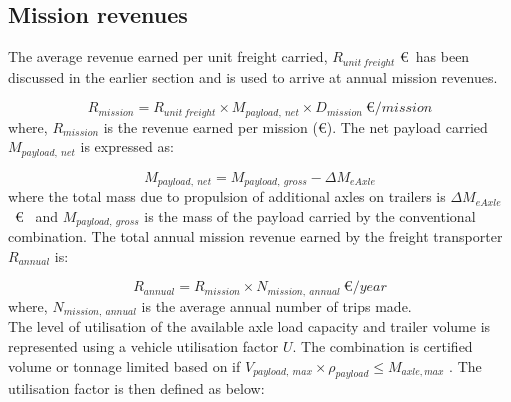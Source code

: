 \documentclass[ExampleMasters.tex]{subfiles}
\begin{document}
		\subsection{Mission revenues}

		The average revenue earned per unit freight carried, $R_{unit\ freight}$  \euro \ has been discussed in the earlier section and is used to arrive at annual mission revenues.

		\begin{equation}
			R_{mission} = R_{unit\ freight} \times M_{payload,\ net} \times D_{mission} \  \euro / mission
		\end{equation}
		where, $R_{mission}$  is the revenue earned per mission (\euro). The net payload carried $M_{payload,\ net}$ is expressed as:

		\begin{equation}
			M_{payload,\ net} = M_{payload,\ gross} - \Delta M_{eAxle}
		\end{equation}
		where the total mass due to propulsion of additional axles on trailers is $\Delta M_{eAxle}$ \ \euro \  and $M_{payload,\ gross}$  is the mass of the payload carried by the conventional combination. The total annual mission revenue earned by the freight transporter $R_{annual}$ is:

		\begin{equation}
			R_{annual} = R_{mission} \times N_{mission,\ annual} \  \euro / year
		\end{equation}
		where, $N_{mission,\ annual}$  is the average annual number of trips made. \\

		The level of utilisation of the available axle load capacity and trailer volume is represented using a vehicle utilisation factor $U$. The combination is certified volume or tonnage limited based on if $V_{payload,\ max} \times \rho_{payload} \leq M_{axle, max}$    . The utilisation factor is then defined as below:
\end{document}
